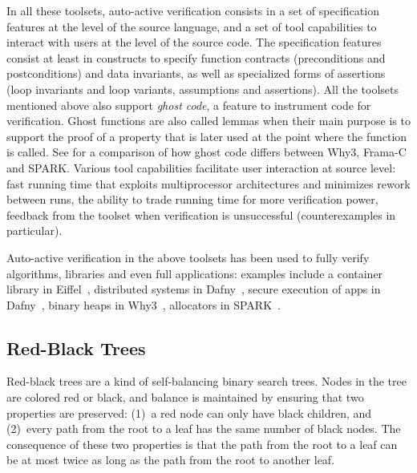 \documentclass{llncs}
\newcommand{\spark}{SPARK\xspace}
\begin{document}
In all these toolsets, auto-active verification consists in a set of
specification features at the level of the source language, and a set of tool
capabilities to interact with users at the level of the source code. The
specification features consist at least in constructs to specify function
contracts (preconditions and postconditions) and data invariants, as well as
specialized forms of assertions (loop invariants and loop variants, assumptions
and assertions). All the toolsets mentioned above also support \emph{ghost code},
a feature to instrument code for verification. Ghost
functions are also called lemmas when their main purpose is to support the
proof of a property that is later used at the point where the function is
called. See \cite{kosmatov:hal-01344110} for a comparison of how ghost code
differs between Why3, Frama-C and \spark. Various tool capabilities facilitate
user interaction at source level: fast running time that exploits
multiprocessor architectures and minimizes rework between runs, the ability to
trade running time for more verification power, feedback from the toolset when
verification is unsuccessful (counterexamples in particular).

Auto-active verification in the above toolsets has been used to fully verify
algorithms, libraries and even full applications: examples include a
container library in Eiffel~\cite{Polikarpova2015}, distributed systems in
Dafny~\cite{Hawblitzel2015IronFleet}, secure execution of apps in
Dafny~\cite{Hawblitzel2014Ironclad}, binary heaps in Why3~\cite{tafat11rr},
allocators in \spark~\cite{Dross2016}.

\subsection{Red-Black Trees}
\label{sec-prelim-rbt}

Red-black trees are a kind of self-balancing binary search trees. Nodes in the
tree are colored red or black, and balance is maintained by ensuring that two
properties are preserved: (1)~a red node can only have black children, and
(2)~every path from the root to a leaf has the same number of black nodes. The
consequence of these two properties is that the path from the root to a leaf
can be at most twice as long as the path from the root to another leaf.
\end{document}
